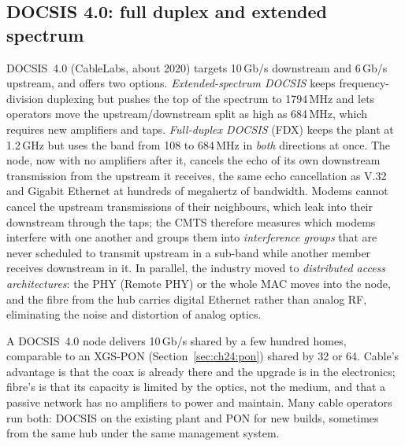 \subsection{DOCSIS 4.0: full duplex and extended spectrum}

DOCSIS~4.0 (CableLabs, about 2020) targets 10\,Gb/s downstream and 6\,Gb/s upstream, and offers two
options. \emph{Extended-spectrum DOCSIS} keeps frequency-division duplexing but pushes the top of the
spectrum to 1794\,MHz and lets operators move the upstream/downstream split as high as 684\,MHz,
which requires new amplifiers and taps. \emph{Full-duplex DOCSIS} (FDX) keeps the plant at 1.2\,GHz but
uses the band from 108 to 684\,MHz in \emph{both} directions at once. The node, now with no amplifiers
after it, cancels the echo of its own downstream transmission from the upstream it receives, the same
echo cancellation as V.32 and Gigabit Ethernet at hundreds of megahertz of bandwidth. Modems cannot
cancel the upstream transmissions of their neighbours, which leak into their downstream through the
taps; the CMTS therefore measures which modems interfere with one another and groups them into
\emph{interference groups} that are never scheduled to transmit upstream in a sub-band while another
member receives downstream in it. In parallel, the industry moved to \emph{distributed access
architectures}: the PHY (Remote PHY) or the whole MAC moves into the node, and the fibre from the hub
carries digital Ethernet rather than analog RF, eliminating the noise and distortion of analog optics.


\begin{inpractice}
A DOCSIS~4.0 node delivers 10\,Gb/s shared by a few hundred homes, comparable to an XGS-PON
(Section~\ref{sec:ch24:pon}) shared by 32 or 64. Cable's advantage is that the coax is already there
and the upgrade is in the electronics; fibre's is that its capacity is limited by the optics, not the
medium, and that a passive network has no amplifiers to power and maintain. Many cable operators run
both: DOCSIS on the existing plant and PON for new builds, sometimes from the same hub under the same
management system.
\end{inpractice}

